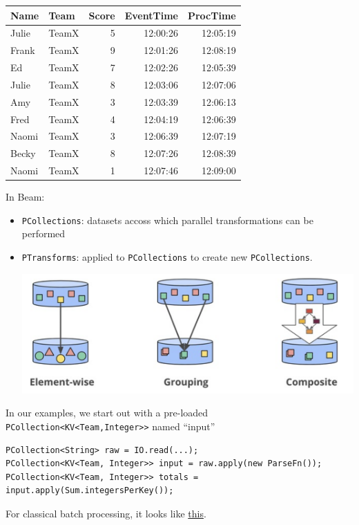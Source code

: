 \documentclass[11pt]{article}
\begin{document}
\begin{center}
\begin{tabular}{llrrr}
\hline
Name & Team & Score & EventTime & ProcTime\\[0pt]
\hline
Julie & TeamX & 5 & 12:00:26 & 12:05:19\\[0pt]
Frank & TeamX & 9 & 12:01:26 & 12:08:19\\[0pt]
Ed & TeamX & 7 & 12:02:26 & 12:05:39\\[0pt]
Julie & TeamX & 8 & 12:03:06 & 12:07:06\\[0pt]
Amy & TeamX & 3 & 12:03:39 & 12:06:13\\[0pt]
Fred & TeamX & 4 & 12:04:19 & 12:06:39\\[0pt]
Naomi & TeamX & 3 & 12:06:39 & 12:07:19\\[0pt]
Becky & TeamX & 8 & 12:07:26 & 12:08:39\\[0pt]
Naomi & TeamX & 1 & 12:07:46 & 12:09:00\\[0pt]
\hline
\end{tabular}
\end{center}

In Beam:
\begin{itemize}
\item \texttt{PCollections}: datasets accoss which parallel transformations can be performed
\item \texttt{PTransforms}: applied to \texttt{PCollections} to create new \texttt{PCollections}.
\begin{center}
\includegraphics[width=.8\textwidth]{../images/streamingsystems/2.png}
\end{center}
\end{itemize}
In our examples, we start out with a pre-loaded \texttt{PCollection<KV<Team,Integer>>} named ``input''
\begin{verbatim}
PCollection<String> raw = IO.read(...);
PCollection<KV<Team, Integer>> input = raw.apply(new ParseFn());
PCollection<KV<Team, Integer>> totals =
input.apply(Sum.integersPerKey());
\end{verbatim}
For classical batch processing, it looks like \href{http://www.streamingbook.net/fig/2-3}{this}.
\end{document}

